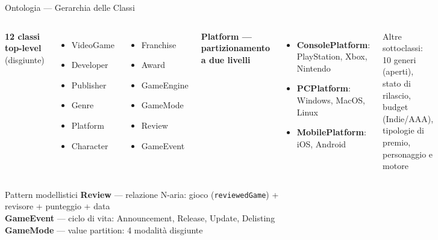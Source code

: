 \documentclass[aspectratio=169,11pt]{beamer}
\begin{document}
\begin{frame}{Ontologia --- Gerarchia delle Classi}
  \begin{columns}[T]
    \textbf{12 classi top-level} {\scriptsize (disgiunte)}
    \vspace{2pt}

    \small
    \begin{columns}[T]
      \begin{itemize}\setlength{\itemsep}{-1pt}
        \item VideoGame
        \item Developer
        \item Publisher
        \item Genre
        \item Platform
        \item Character
      \end{itemize}
      \begin{itemize}\setlength{\itemsep}{-1pt}
        \item Franchise
        \item Award
        \item GameEngine
        \item GameMode
        \item Review
        \item GameEvent
      \end{itemize}
    \end{columns}

    \textbf{Platform --- partizionamento a due livelli}
    \vspace{2pt}

    \small
    \begin{itemize}
      \item \textbf{ConsolePlatform}: PlayStation, Xbox, Nintendo
      \item \textbf{PCPlatform}: Windows, MacOS, Linux
      \item \textbf{MobilePlatform}: iOS, Android
    \end{itemize}
    \vspace{2pt}
    Altre sottoclassi: 10 generi (aperti), stato di rilascio, budget (Indie/AAA),
    tipologie di premio, personaggio e motore
  \end{columns}

  \vspace{6pt}

  \begin{block}{Pattern modellistici}
    \small
    \textbf{Review} --- relazione N-aria: gioco (\texttt{reviewedGame}) + revisore + punteggio + data \\
    \textbf{GameEvent} --- ciclo di vita: Announcement, Release, Update, Delisting \\
    \textbf{GameMode} --- value partition: 4 modalit\`a disgiunte
  \end{block}
\end{frame}
\end{document}

